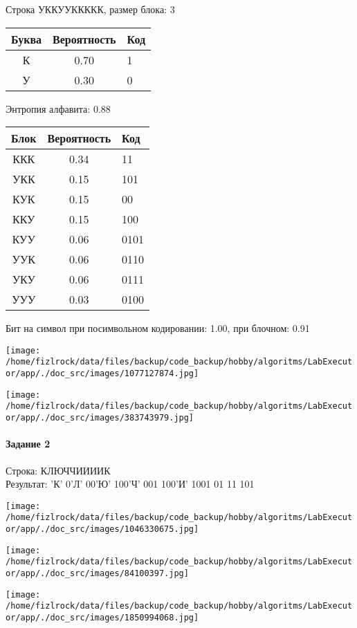 \documentclass[a4paper, 12pt]{article}
\begin{document}
Строка УККУУККККК, размер блока: 3
\begin{center}
 \begin{tabular}{ |c|c|l| } 
  \hline
     Буква & Вероятность & Код\\ \hline
К & 0.70 & 1\\\hline
У & 0.30 & 0
\\ \hline \end{tabular}
\end{center}
Энтропия алфавита: 0.88
\begin{center}
 \begin{tabular}{ |c|c|l| } 
  \hline
     Блок & Вероятность & Код\\ \hline
ККК & 0.34 & 11\\\hline
УКК & 0.15 & 101\\\hline
КУК & 0.15 & 00\\\hline
ККУ & 0.15 & 100\\\hline
КУУ & 0.06 & 0101\\\hline
УУК & 0.06 & 0110\\\hline
УКУ & 0.06 & 0111\\\hline
УУУ & 0.03 & 0100
\\ \hline \end{tabular}
\end{center}
Бит на символ при посимвольном кодировании: 1.00, при блочном: 0.91

\texttt{[image: /home/fizlrock/data/files/backup/code\_backup/hobby/algoritms/LabExecutor/app/./doc\_src/images/1077127874.jpg]}

\texttt{[image: /home/fizlrock/data/files/backup/code\_backup/hobby/algoritms/LabExecutor/app/./doc\_src/images/383743979.jpg]}
\pagebreak
\paragraph{Задание 2}

Строка: 
КЛЮЧЧИИИИК\\
Результат: 'К' 0'Л' 00'Ю' 100'Ч' 001 100'И' 1001 01 11 101

\texttt{[image: /home/fizlrock/data/files/backup/code\_backup/hobby/algoritms/LabExecutor/app/./doc\_src/images/1046330675.jpg]}

\texttt{[image: /home/fizlrock/data/files/backup/code\_backup/hobby/algoritms/LabExecutor/app/./doc\_src/images/84100397.jpg]}

\texttt{[image: /home/fizlrock/data/files/backup/code\_backup/hobby/algoritms/LabExecutor/app/./doc\_src/images/1850994068.jpg]}
\end{document}
